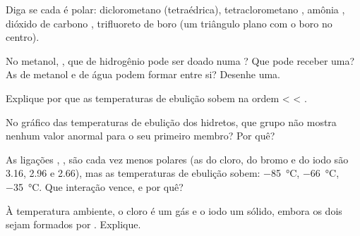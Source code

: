 \begin{exercise}[$\star\star$]\label{exo:g11:polarity-and-cohesion:6}
Diga se cada  é polar: diclorometano  (tetraédrica),
tetraclorometano , amônia , dióxido de carbono
, trifluoreto de boro  (um triângulo plano com o boro no
centro).
\end{exercise}

\begin{exercise}[$\star\star$]\label{exo:g11:polarity-and-cohesion:7}
No metanol, , que  de hidrogênio pode ser doado numa
? Que  pode receber uma? As  de
metanol e de água podem formar  entre si? Desenhe
uma.
\end{exercise}

\begin{exercise}[$\star\star$]\label{exo:g11:polarity-and-cohesion:8}
Explique por que as temperaturas de ebulição sobem na ordem  <
 < .
\end{exercise}

\begin{exercise}[$\star\star$]\label{exo:g11:polarity-and-cohesion:9}
No gráfico das temperaturas de ebulição dos hidretos, que grupo não
mostra nenhum valor anormal para o seu primeiro membro? Por quê?
\end{exercise}

\begin{exercise}[$\star\star$]\label{exo:g11:polarity-and-cohesion:10}
As ligações , ,  são cada vez menos polares
(as  do cloro, do bromo e do iodo são 3.16, 2.96 e
2.66), mas as temperaturas de ebulição sobem: \qty{-85}{\celsius},
\qty{-66}{\celsius}, \qty{-35}{\celsius}. Que interação vence, e por
quê?
\end{exercise}

\begin{exercise}[$\star\star$]\label{exo:g11:polarity-and-cohesion:11}
À temperatura ambiente, o cloro é um gás e o iodo um sólido, embora os
dois sejam formados por  . Explique.
\end{exercise}


